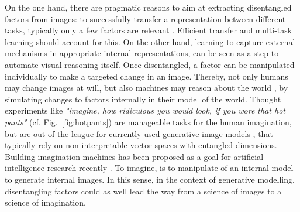 	On the one hand, there are pragmatic reasons to aim at extracting disentangled factors from images: to successfully transfer a representation between different tasks, typically only a few factors are relevant \cite{bengio13rep}.
	Efficient transfer and multi-task learning should account for this. %
	On the other hand, learning to capture external mechanisms in appropriate internal representations, can be seen as a step to automate visual reasoning itself.
	Once disentangled, a factor can be manipulated individually to make a targeted change in an image. Thereby, not only humans may change images at will, but also machines may reason about the world \cite{pearl18impediments}, by simulating changes to factors internally in their model of the world.
	Thought experiments like \textit{"imagine, how ridiculous you would look, if you wore that hot pants"} (cf. Fig.~\ref{fig:hotpants}) are manageable tasks for the human imagination, but are out of the league for currently used generative image models \cite{goodfellow14gan, kingma13vae}, that typically rely on non-interpretable vector spaces with entangled dimensions.
	Building imagination machines has been proposed as a goal for artificial intelligence research recently \cite{mahadevan18imagine}.
	To imagine, is to manipulate of an internal model to generate internal images.
	In this sense, in the context of generative modelling, disentangling factors could as well lead the way from a science of images to a science of imagination.

